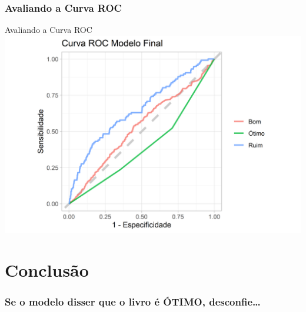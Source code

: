 \documentclass[
  9 pt,
  ignorenonframetext,
]{beamer}
\begin{document}
\hypertarget{avaliando-a-curva-roc}{%
\subsubsection{Avaliando a Curva ROC}\label{avaliando-a-curva-roc}}

\begin{frame}{Avaliando a Curva ROC}
\includegraphics{apresentacao_files/figure-beamer/unnamed-chunk-24-1.png}
\end{frame}

\hypertarget{conclusuxe3o}{%
\section{Conclusão}\label{conclusuxe3o}}

\hypertarget{se-o-modelo-disser-que-o-livro-uxe9-uxf3timo-desconfie}{%
\subsubsection{Se o modelo disser que o livro é ÓTIMO,
desconfie\ldots{}}\label{se-o-modelo-disser-que-o-livro-uxe9-uxf3timo-desconfie}}
\end{document}
